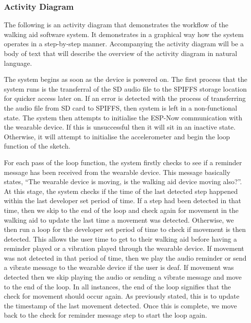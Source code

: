                 \newpage

            \subsubsection{Activity Diagram}
            \label{subsubsec:walking_aid_activity}

                The following is an activity diagram that demonstrates the workflow of the walking aid software system. It demonstrates in a graphical way how the system operates in a step-by-step manner. Accompanying the activity diagram will be a body of text that will describe the overview of the activity diagram in natural language.

                
                
                The system begins as soon as the device is powered on. The first process that the system runs is the transferral of the SD audio file to the SPIFFS storage location for quicker access later on. If an error is detected with the process of transferring the audio file from SD card to SPIFFS, then system is left in a non-functional state. The system then attempts to initialise the ESP-Now communication with the wearable device. If this is unsuccessful then it will sit in an inactive state. Otherwise, it will attempt to initialise the accelerometer and begin the loop function of the sketch. 

                For each pass of the loop function, the system firstly checks to see if a reminder message has been received from the wearable device. This message basically states, ``The wearable device is moving, is the walking aid device moving also?''. At this stage, the system checks if the time of the last detected step happened within the last developer set period of time. If a step had been detected in that time, then we skip to the end of the loop and check again for movement in the walking aid to update the last time a movement was detected. Otherwise, we then run a loop for the developer set period of time to check if movement is then detected. This allows the user time to get to their walking aid before having a reminder played or a vibration played through the wearable device. If movement was not detected in that period of time, then we play the audio reminder or send a vibrate message to the wearable device if the user is deaf. If movement was detected then we skip playing the audio or sending a vibrate message and move to the end of the loop. In all instances, the end of the loop signifies that the check for movement should occur again. As previously stated, this is to update the timestamp of the last movement detected. Once this is complete, we move back to the check for reminder message step to start the loop again.

